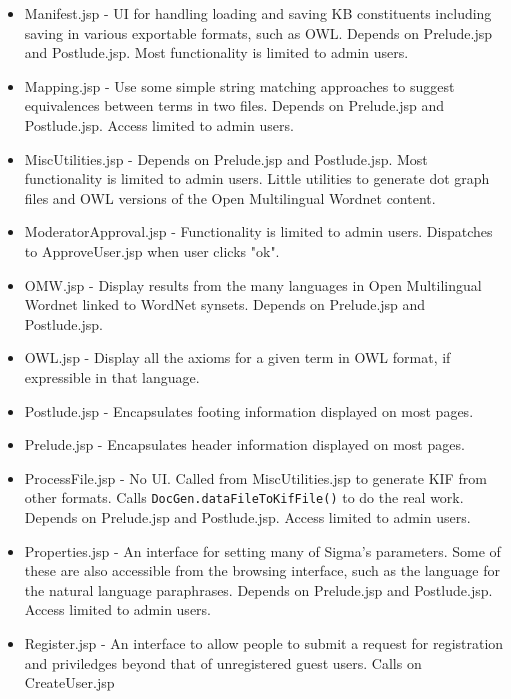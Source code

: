 \documentclass{book}
\begin{document}
\begin{itemize}
\item Manifest.jsp - UI for handling loading and saving KB constituents including saving in various
exportable formats, such as OWL. Depends on Prelude.jsp and Postlude.jsp. Most functionality
is limited to admin users.

\item Mapping.jsp - Use some simple string matching approaches to suggest equivalences between terms
in two files.  Depends on Prelude.jsp and Postlude.jsp. Access limited to admin users.

\item MiscUtilities.jsp - Depends on Prelude.jsp and Postlude.jsp. Most functionality
is limited to admin users. Little utilities to generate dot graph files and OWL versions of
the Open Multilingual Wordnet content.

\item ModeratorApproval.jsp - Functionality is limited to admin users. Dispatches to ApproveUser.jsp
when user clicks "ok".

\item OMW.jsp - Display results from the many languages in Open Multilingual Wordnet linked to
WordNet synsets. Depends on Prelude.jsp and Postlude.jsp.

\item OWL.jsp - Display all the axioms for a given term in OWL format, if expressible in that
language.

\item Postlude.jsp - Encapsulates footing information displayed on most pages.

\item Prelude.jsp - Encapsulates header information displayed on most pages.

\item ProcessFile.jsp - No UI. Called from MiscUtilities.jsp to generate KIF from other
formats. Calls \texttt{DocGen.dataFileToKifFile()} to do the real work. Depends on Prelude.jsp and
Postlude.jsp. Access limited to admin users.

\item Properties.jsp - An interface for setting many of Sigma's parameters.  Some of these are
also accessible from the browsing interface, such as the language for the natural
language paraphrases. Depends on Prelude.jsp and Postlude.jsp. Access limited to admin users.

\item Register.jsp - An interface to allow people to submit a request for registration and
priviledges beyond that of unregistered guest users.  Calls on CreateUser.jsp


\end{itemize}
\end{document}
